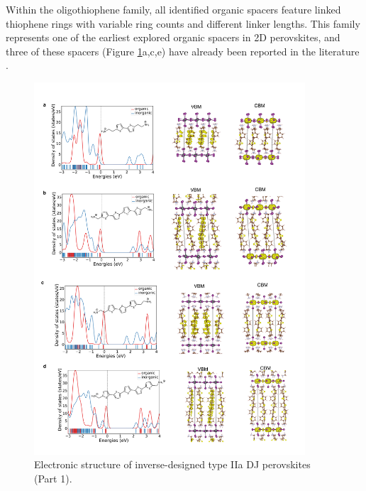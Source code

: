 Within the oligothiophene family, all identified organic spacers feature linked thiophene rings with variable ring counts and different linker lengths. This family represents one of the earliest explored organic spacers in 2D perovskites, and three of these spacers (Figure \ref{fig:figure5.23}a,c,e) have already been reported in the literature \cite{RN18, RN38}.


\begin{figure}[htbp]
    \centering
    \includegraphics[width=0.9\textwidth]{figures/synthesis-feasibility/figure5-23-1.png}
    \caption{Electronic structure of inverse-designed type IIa DJ perovskites (Part 1).}
    \label{fig:figure5.23}
\end{figure}

